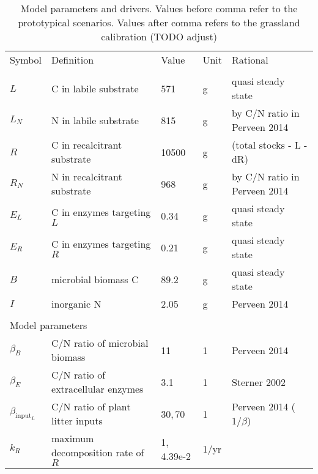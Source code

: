 % 

\begin{table}[t]
\caption{
\label{tab:modelParameters}
Model parameters and drivers. Values before comma refer to the prototypical
scenarios. Values after comma refers to the grassland calibration (TODO adjust) 
} 
\vskip4mm
\centering
\begin{tabular}{lp{6cm}llp{5.5cm}}
\tophline
Symbol &  Definition & Value & Unit & Rational \\
\middlehline
\multicolumn{5}{l}{State variables}  \\
$L$ &  C in labile substrate & 571 & g & quasi steady state \\
$L_N$ &  N in labile substrate & 815 & g & by C/N ratio in Perveen 2014
\\
$R$ &  C in recalcitrant substrate & 10500 & g & \citep{Allard07} (total stocks
- L - dR)
\\
$R_N$ &  N in recalcitrant substrate & 968 & g & by C/N ratio in Perveen 2014 \\
$E_L$ &  C in enzymes targeting $L$ & 0.34 & g &  quasi steady state \\
$E_R$ &  C in enzymes targeting $R$ & 0.21 & g &  quasi steady state \\
$B$ & microbial biomass C & 89.2 & g &  quasi steady state \\
$I$ & inorganic N & 2.05 & g & Perveen 2014 \\
\\
\multicolumn{5}{l}{Model parameters}  \\
$\beta_B$ &  C/N ratio of microbial biomass & 11 & 1 & Perveen
2014 \\
$\beta_E$ &  C/N ratio of extracellular enzymes & 3.1 & 1 &
Sterner 2002 \\
$\beta_{\mathrm{input}_L}$ &  C/N ratio of plant litter inputs & 30,\,70 & 1 &
Perveen 2014 ($1/\beta$) \\
$k_R$ &  maximum decomposition rate of $R$ & 1, 4.39e-2 & 1/yr

\end{tabular}
\end{table}
